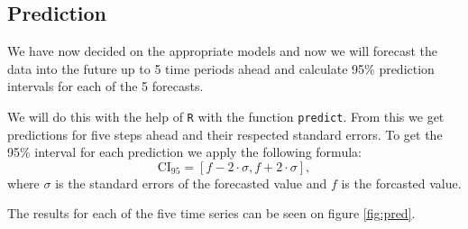 \documentclass{article}
\begin{document}
\subsection{Prediction}

We have now decided on the appropriate models and now we will
forecast the data into the future up to 5 time periods
ahead and calculate 95\% prediction intervals for each of the 5 forecasts.

We will do this with the help of  \verb|R| with the function \verb|predict|.
From this we get predictions for five steps ahead and their 
respected standard errors. To get the 
95\% interval for each prediction we apply the following formula:
$$\text{CI}_{95} = [f - 2 \cdot \sigma, f + 2 \cdot \sigma],$$
where $\sigma$ is the standard errors of the forecasted value and 
$f$ is the forcasted value. 

The results for each of the five time series can be seen on figure 
\ref{fig:pred}. 
\end{document}
